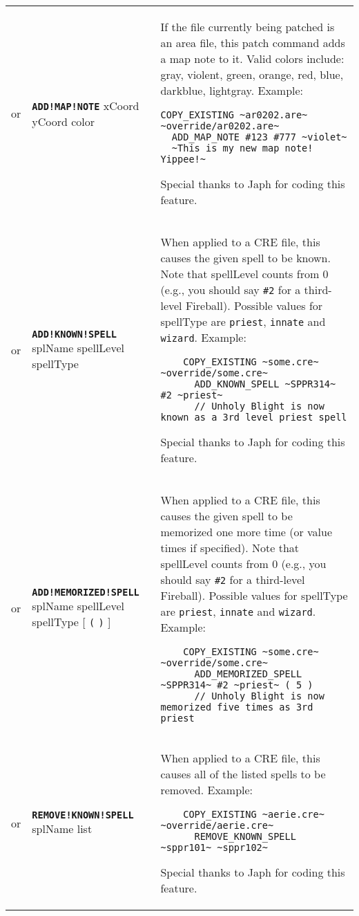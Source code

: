 \documentclass{article}
\def\ttref#1{\ahrefloc{#1}{\tt #1}}
\def\DEFINE#1{{\tt \bf #1}\label{#1}\index{#1}}
\def\t#1{{\tt #1}}
\def\Slist{{\color{red} list }}
\def\Ob{{\color{red} [ }}
\def\Oe{{\color{red} ] }}
\begin{document}
\begin{tabular}{cp{10in}|p{10in}}
  or & \DEFINE{ADD!MAP!NOTE} xCoord yCoord color \ttref{String} &
    If the file currently being patched is an \ttref{ARE} area file, this
    patch command adds a map note to it. Valid colors include: gray,
    violent, green, orange, red, blue, darkblue, lightgray.
    Example:
\begin{verbatim}
COPY_EXISTING ~ar0202.are~ ~override/ar0202.are~
  ADD_MAP_NOTE #123 #777 ~violet~
  ~This is my new map note!  Yippee!~
\end{verbatim}
    Special thanks to Japh for coding this feature.  \\

or & \DEFINE{ADD!KNOWN!SPELL} splName spellLevel spellType &
  When applied to a CRE file, this \ttref{patch} causes the given spell to
  be known. Note that spellLevel counts from 0 (e.g., you should say
  \t{\#2} for a third-level Fireball). Possible values for spellType are
  \t{priest}, \t{innate} and \t{wizard}. Example:
\begin{verbatim}
    COPY_EXISTING ~some.cre~ ~override/some.cre~
      ADD_KNOWN_SPELL ~SPPR314~ #2 ~priest~
      // Unholy Blight is now known as a 3rd level priest spell
\end{verbatim}
  Special thanks to Japh for coding this feature.  \\

or & \DEFINE{ADD!MEMORIZED!SPELL} splName spellLevel spellType
  \Ob \t{(} \ttref{value} \t{)} \Oe&
  When applied to a CRE file, this \ttref{patch} causes the given spell to
  be memorized one more time (or value times if specified).
  Note that spellLevel counts from 0 (e.g., you
  should say \t{\#2} for a third-level Fireball). Possible values for spellType
  are \t{priest}, \t{innate} and \t{wizard}. Example:
\begin{verbatim}
    COPY_EXISTING ~some.cre~ ~override/some.cre~
      ADD_MEMORIZED_SPELL ~SPPR314~ #2 ~priest~ ( 5 )
      // Unholy Blight is now memorized five times as 3rd priest
\end{verbatim} \\

or & \DEFINE{REMOVE!KNOWN!SPELL} splName \Slist &
  When applied to a CRE file, this \ttref{patch} causes all of the
  listed spells to be removed. Example:
\begin{verbatim}
    COPY_EXISTING ~aerie.cre~ ~override/aerie.cre~
      REMOVE_KNOWN_SPELL ~sppr101~ ~sppr102~
\end{verbatim}
  Special thanks to Japh for coding this feature.  \\


\end{tabular}
\end{document}
